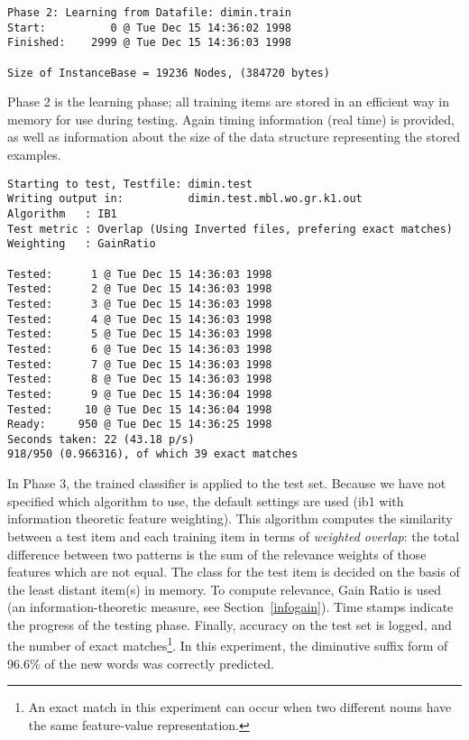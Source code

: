 \documentclass{report}
\begin{document}
\vspace{1cm}
\hline

{\small
\begin{verbatim}
Phase 2: Learning from Datafile: dimin.train
Start:          0 @ Tue Dec 15 14:36:02 1998
Finished:    2999 @ Tue Dec 15 14:36:03 1998

Size of InstanceBase = 19236 Nodes, (384720 bytes)
\end{verbatim}
}

\hline
\vspace{1cm}

Phase 2 is the learning phase; all training items are stored in an
efficient way in memory for use during testing. Again timing
information (real time) is provided, as well as information about the
size of the data structure representing the stored examples.

\vspace{1cm}
\hline

{\small
\begin{verbatim}
Starting to test, Testfile: dimin.test
Writing output in:          dimin.test.mbl.wo.gr.k1.out
Algorithm   : IB1
Test metric : Overlap (Using Inverted files, prefering exact matches)
Weighting   : GainRatio

Tested:      1 @ Tue Dec 15 14:36:03 1998
Tested:      2 @ Tue Dec 15 14:36:03 1998
Tested:      3 @ Tue Dec 15 14:36:03 1998
Tested:      4 @ Tue Dec 15 14:36:03 1998
Tested:      5 @ Tue Dec 15 14:36:03 1998
Tested:      6 @ Tue Dec 15 14:36:03 1998
Tested:      7 @ Tue Dec 15 14:36:03 1998
Tested:      8 @ Tue Dec 15 14:36:03 1998
Tested:      9 @ Tue Dec 15 14:36:04 1998
Tested:     10 @ Tue Dec 15 14:36:04 1998
Ready:     950 @ Tue Dec 15 14:36:25 1998
Seconds taken: 22 (43.18 p/s)
918/950 (0.966316), of which 39 exact matches 
\end{verbatim}
}

\hline
\vspace{1cm}

In Phase 3, the trained classifier is applied to the test set. Because
we have not specified which algorithm to use, the default settings are
used ({\sc ib1} with information theoretic feature weighting). This
algorithm computes the similarity between a test item and each
training item in terms of {\em weighted overlap}: the total difference
between two patterns is the sum of the relevance weights of those
features which are not equal. The class for the test item is decided
on the basis of the least distant item(s) in memory. To compute
relevance, Gain Ratio is used (an information-theoretic measure, see
Section~\ref{infogain}). Time stamps indicate the progress of the
testing phase. Finally, accuracy on the test set is logged, and the
number of exact matches\footnote{An exact match in this experiment can
occur when two different nouns have the same feature-value
representation.}. In this experiment, the diminutive suffix form of
96.6\% of the new words was correctly predicted.
\end{document}
